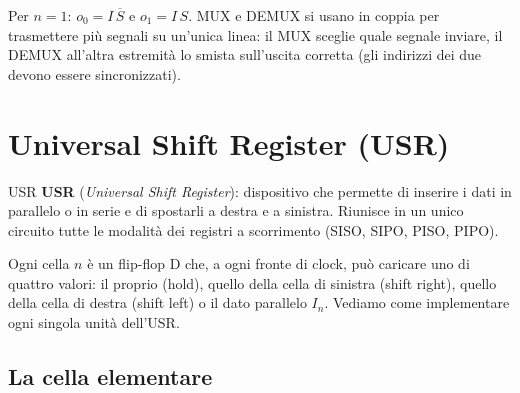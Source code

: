 \noindent Per $n=1$: $o_0 = I\,\overline{S}$ e $o_1 = I\,S$. MUX e DEMUX si usano in coppia
per trasmettere più segnali su un'unica linea: il MUX sceglie quale segnale inviare, il DEMUX
all'altra estremità lo smista sull'uscita corretta (gli indirizzi dei due devono essere
sincronizzati).

\section{Universal Shift Register (USR)}

\begin{definizione}{USR}
\textbf{USR} (\emph{Universal Shift Register}): dispositivo che permette di inserire i dati in
parallelo o in serie e di spostarli a destra e a sinistra. Riunisce in un unico circuito
tutte le modalità dei registri a scorrimento (SISO, SIPO, PISO, PIPO).
\end{definizione}

\begin{center}
\end{center}

\noindent Ogni cella $n$ è un flip-flop D che, a ogni fronte di clock, può caricare uno di
quattro valori: il proprio (hold), quello della cella di sinistra (shift right), quello
della cella di destra (shift left) o il dato parallelo $I_n$. Vediamo come implementare
ogni singola unità dell'USR.

\subsection{La cella elementare}

